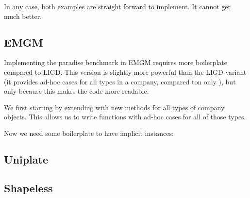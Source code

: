 In any case, both examples are straight forward to implement. It cannot get
much better.


\subsection{EMGM}

Implementing the paradise benchmark in EMGM requires more boilerplate compared
to LIGD. This version is slightly more powerful than the LIGD variant (it
provides ad-hoc cases for all types in a company, compared ton only ),
but only because this makes the code more readable.

We first starting by extending  with new methods for all types of
company objects. This allows us to write functions with ad-hoc cases for all
of those types.



Now we need some boilerplate to have implicit  instances:




\begin{example}

\end{example}

\begin{example}

\end{example}

\subsection{Uniplate}


\begin{example}

\end{example}

\begin{example}

\end{example}


\subsection{Shapeless}


